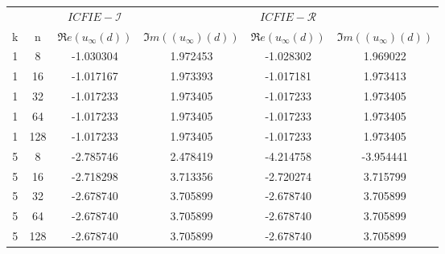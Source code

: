 \begin{tabular}{|cc|cc|cc|}\hline 
 & & $ICFIE-\mathcal{I}$& &$ICFIE-\mathcal{R}$ & \\k &  n & $\Re{e}\left(u_\infty(d)\right)$ & $\Im{m}\left((u_\infty)(d)\right)$ & $\Re{e}\left(u_\infty(d)\right)$ & $\Im{m}\left((u_\infty)(d)\right)$ \\ \hline 
1 & 8 & -1.030304 & 1.972453 & -1.028302 & 1.969022 \\ 
\hline 
1 & 16 & -1.017167 & 1.973393 & -1.017181 & 1.973413 \\ 
\hline 
1 & 32 & -1.017233 & 1.973405 & -1.017233 & 1.973405 \\ 
\hline 
1 & 64 & -1.017233 & 1.973405 & -1.017233 & 1.973405 \\ 
\hline 
1 & 128 & -1.017233 & 1.973405 & -1.017233 & 1.973405 \\ 
\hline 
5 & 8 & -2.785746 & 2.478419 & -4.214758 & -3.954441 \\ 
\hline 
5 & 16 & -2.718298 & 3.713356 & -2.720274 & 3.715799 \\ 
\hline 
5 & 32 & -2.678740 & 3.705899 & -2.678740 & 3.705899 \\ 
\hline 
5 & 64 & -2.678740 & 3.705899 & -2.678740 & 3.705899 \\ 
\hline 
5 & 128 & -2.678740 & 3.705899 & -2.678740 & 3.705899 \\ 
\hline 
\end{tabular}
